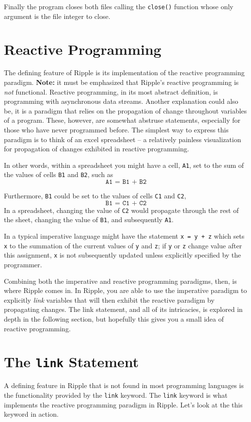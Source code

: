 \documentclass{article}
\newcommand{\code}{\texttt}
\begin{document}
Finally the program closes both files calling the \code{close()} function whose only argument is the file integer to close.

\section{Reactive Programming}
The defining feature of Ripple is its implementation of the reactive programming paradigm. \textbf{Note:} it must be emphasized that Ripple's reactive programming is \emph{not} functional. Reactive programming, in its most abstract definition, is programming with asynchronous data streams. Another explanation could also be, it is a paradigm that relies on the propagation of change throughout variables of a program. These, however, are somewhat abstruse statements, especially for those who have never programmed before. The simplest way to express this paradigm is to think of an excel spreadsheet -- a relatively painless visualization for propagation of changes exhibited in reactive programming. 

In other words, within a spreadsheet you might have a cell, \code{A1}, set to the sum of the values of cells \code{B1} and \code{B2}, such as
\[ \code{A1 = B1 + B2} \]

Furthermore, \code{B1} could be set to the values of cells \code{C1} and \code{C2},
\[ \code{B1 = C1 + C2} \]
In a spreadsheet, changing the value of \code{C2} would propagate through the rest of the sheet, changing the value of \code{B1}, and subsequently \code{A1}.

In a typical imperative language might have the statement \code{x = y + z} which sets \code{x} to the summation of the current values of \code{y} and \code{z}; if \code{y} or \code{z} change value after this assignment, \code{x} is not subsequently updated unless explicitly specified by the programmer. 

Combining both the imperative and reactive programming paradigms, then, is where Ripple comes in. In Ripple, you are able to use the imperative paradigm to explicitly \emph{link} variables that will then exhibit the reactive paradigm by propagating changes. The link statement, and all of its intricacies, is explored in depth in the following section, but hopefully this gives you a small idea of reactive programming. 

\section{The \code{link} Statement}
A defining feature in Ripple that is not found in most programming languages is the functionality provided by the \code{link} keyword. The \code{link} keyword is what implements the reactive programming paradigm in Ripple. Let's look at the this keyword in action.
\end{document}
